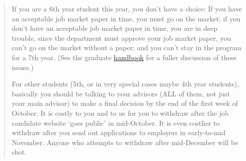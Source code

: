 \documentclass{\classes/econtex}
\begin{document}
\begin{enumerate}
  \begin{quote}
    If you are a 6th year student this year, you don't have a choice: If
    you have an acceptable job market paper in time, you must go on the
    market; if you don't have an acceptable job market paper in time, you
    are in deep trouble, since the department must approve your job market
    paper, you can't go on the market without a paper; and you can't stay
    in the program for a 7th year.  (See the graduate \href{http://www.econ2.jhu.edu/pdf/Econ\_Grad\_Handbook.pdf}{handbook} for a fuller discussion of these issues.) 

      For other students (5th, or in very special cases maybe 4th year students), basically you should be talking to your advisors (ALL of them, not just your main advisor) to make a final decision by the end of the first week of October.  It is costly to you and to us for you to withdraw after the job candidate website `goes public' in mid-October.  It is even costlier to withdraw after you send out applications to employers in early-to-mid November.  Anyone who attempts to withdraw after mid-December will be shot.

      \begin{comment}

        In the dept meeting on 2006-10-17 a question was raised about
        whether we are really serious about our policy, as stated by Larry,
        that ``there is no such thing as a 7th year student.''  

        The answer is yes.

        There was then some discussion about the relationship between going
        on the job market and remaining in the program, caused by the fact
        that there are currently three students (Tereanu, Svitil, Lu) who
        are clearly not ready for the job market but have not given up all
        hope of finishing a dissertation by August of next year.

        The resolution (subsequently clarified in emails on 2006-10-18 and
        2006-10-19 and an email to Zhou Lu on 2006-10-19 from CDC) was as
        follows.

        Our declared public policy (see the graduate \href{handbook}{http://www.econ2.jhu.edu/pdf/Econ_Grad_Handbook.pdf}) is that nobody can enroll for a 7th year
        in the program.  In practice, if in the opinion of an advisor and
        second advisor, a student's dissertation is essentially complete as
        of August of the 6th year, we may relax this rigor slightly in order
        to arrange a defense and final ``cleaning up'' of details - but \textit{  only} in the case where the dissertation is in all essentials
        complete.


\end{comment}
\end{quote}
\end{enumerate}
\end{document}
